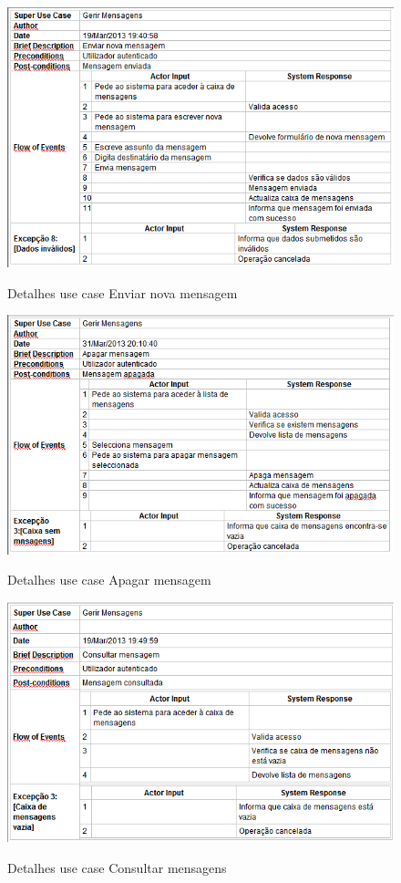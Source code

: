 ﻿\documentclass[12pt,a4paper]{article}
\begin{document}
\begin{figure}[h!]
\centering
\includegraphics[scale=0.7]{d_usecase/enviarmensagem}
\label{usecase}
\caption{Detalhes use case Enviar nova mensagem}
\end{figure}

\begin{figure}[h!]
\centering
\includegraphics[scale=0.7]{d_usecase/apagarmensagem}
\label{usecase}
\caption{Detalhes use case Apagar mensagem}
\end{figure}

\begin{figure}[h!]
\centering
\includegraphics[scale=0.7]{d_usecase/consultarmensagem}
\label{usecase}
\caption{Detalhes use case Consultar mensagens}
\end{figure}
\end{document}
